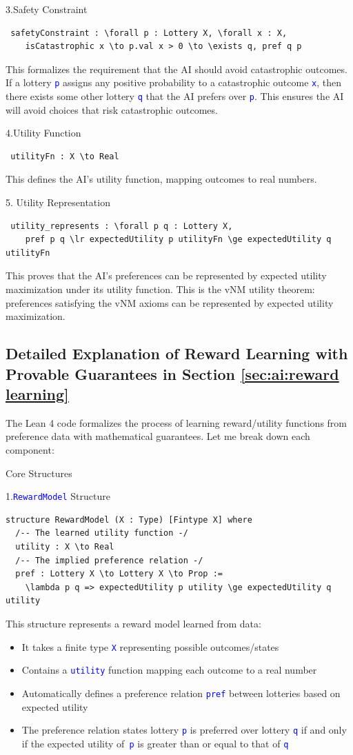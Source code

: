 \documentclass{article}
\theoremstyle{definition}
\newcommand{\tactic}[1]{\textcolor{blue}{\texttt{#1}}}
\begin{document}
3.Safety Constraint
\begin{lstlisting}
 safetyConstraint : \forall p : Lottery X, \forall x : X,
    isCatastrophic x \to p.val x > 0 \to \exists q, pref q p
\end{lstlisting}
This formalizes the requirement that the AI should avoid catastrophic outcomes. If a lottery \tactic{p} assigns any positive probability to a catastrophic outcome \tactic{x}, then there exists some other lottery \tactic{q} that the AI prefers over \tactic{p}. This ensures the AI will avoid choices that risk catastrophic outcomes.

4.Utility Function
\begin{lstlisting}
 utilityFn : X \to Real
\end{lstlisting}
This defines the AI's utility function, mapping outcomes to real numbers.

5. Utility Representation
\begin{lstlisting}
 utility_represents : \forall p q : Lottery X,
    pref p q \lr expectedUtility p utilityFn \ge expectedUtility q utilityFn
\end{lstlisting}
This proves that the AI's preferences can be represented by expected utility maximization under its utility function. This is the vNM utility theorem: preferences satisfying the vNM axioms can be represented by expected utility maximization.

\subsection{Detailed Explanation of Reward Learning with Provable Guarantees in Section \ref{sec:ai:reward learning}}\label{explan:sec:ai:reward learning}
The Lean 4 code formalizes the process of learning reward/utility functions from preference data with mathematical guarantees. Let me break down each component:

Core Structures

1.\tactic{RewardModel} Structure
\begin{lstlisting}
structure RewardModel (X : Type) [Fintype X] where
  /-- The learned utility function -/
  utility : X \to Real
  /-- The implied preference relation -/
  pref : Lottery X \to Lottery X \to Prop :=
    \lambda p q => expectedUtility p utility \ge expectedUtility q utility
\end{lstlisting}
This structure represents a reward model learned from data:
\begin{itemize}
  \item It takes a finite type \tactic{X} representing possible outcomes/states
  \item Contains a \tactic{utility} function mapping each outcome to a real number
  \item Automatically defines a preference relation \tactic{pref} between lotteries based on expected utility
  \item The preference relation states lottery \tactic{p} is preferred over lottery \tactic{q} if and only if the expected utility of\tactic{ p} is greater than or equal to that of \tactic{q}
\end{itemize}
\end{document}

